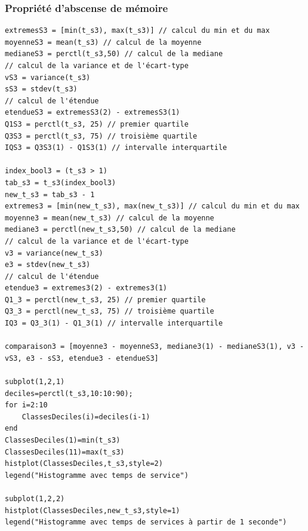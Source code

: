 \documentclass{article}
\begin{document}
\subsubsection{Propriété d'abscense de mémoire}
\begin{verbatim}
extremesS3 = [min(t_s3), max(t_s3)] // calcul du min et du max
moyenneS3 = mean(t_s3) // calcul de la moyenne
medianeS3 = perctl(t_s3,50) // calcul de la mediane
// calcul de la variance et de l'écart-type
vS3 = variance(t_s3)
sS3 = stdev(t_s3)
// calcul de l'étendue
etendueS3 = extremesS3(2) - extremesS3(1)
Q1S3 = perctl(t_s3, 25) // premier quartile
Q3S3 = perctl(t_s3, 75) // troisième quartile
IQS3 = Q3S3(1) - Q1S3(1) // intervalle interquartile

index_bool3 = (t_s3 > 1)
tab_s3 = t_s3(index_bool3)
new_t_s3 = tab_s3 - 1
extremes3 = [min(new_t_s3), max(new_t_s3)] // calcul du min et du max
moyenne3 = mean(new_t_s3) // calcul de la moyenne
mediane3 = perctl(new_t_s3,50) // calcul de la mediane
// calcul de la variance et de l'écart-type
v3 = variance(new_t_s3)
e3 = stdev(new_t_s3)
// calcul de l'étendue
etendue3 = extremes3(2) - extremes3(1)
Q1_3 = perctl(new_t_s3, 25) // premier quartile
Q3_3 = perctl(new_t_s3, 75) // troisième quartile
IQ3 = Q3_3(1) - Q1_3(1) // intervalle interquartile

comparaison3 = [moyenne3 - moyenneS3, mediane3(1) - medianeS3(1), v3 - vS3, e3 - sS3, etendue3 - etendueS3]

subplot(1,2,1)
deciles=perctl(t_s3,10:10:90);
for i=2:10
    ClassesDeciles(i)=deciles(i-1)
end
ClassesDeciles(1)=min(t_s3)
ClassesDeciles(11)=max(t_s3)
histplot(ClassesDeciles,t_s3,style=2)
legend("Histogramme avec temps de service")

subplot(1,2,2)
histplot(ClassesDeciles,new_t_s3,style=1)
legend("Histogramme avec temps de services à partir de 1 seconde")
\end{verbatim}

\end{document}
